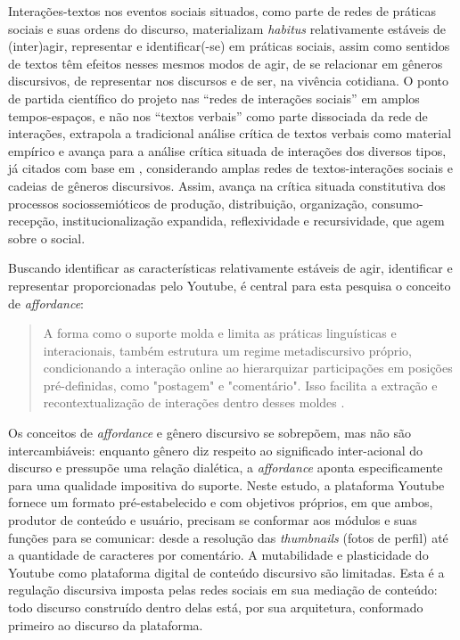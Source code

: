 \documentclass[portuguese]{textolivre}
\begin{document}
Interações-textos nos eventos sociais situados, como parte de redes de práticas sociais e suas ordens do discurso, materializam \textit{habitus} relativamente estáveis de (inter)agir, representar e identificar(-se) em práticas sociais, assim como sentidos de textos têm efeitos nesses mesmos modos de agir, de se relacionar em gêneros discursivos, de representar nos discursos e de ser, na vivência cotidiana. O ponto de partida científico do projeto nas “redes de interações sociais” em amplos tempos-espaços, e não nos “textos verbais” como parte dissociada da rede de interações, extrapola a tradicional análise crítica de textos verbais como material empírico \cite{SilvaRamalho2008GenerosDiscursivos,SilvaVieira2019Multimodalidade} e avança para a análise crítica situada de interações dos diversos tipos, já citados com base em \textcite{Thompson2018InteracaoMediada}, considerando amplas redes de textos-interações sociais e cadeias de gêneros discursivos. Assim, avança na crítica situada constitutiva dos processos sociossemióticos de produção, distribuição, organização, consumo-recepção, institucionalização expandida, reflexividade e recursividade, que agem sobre o social. 

Buscando identificar as características relativamente estáveis de agir, identificar e representar proporcionadas pelo Youtube, é central para esta pesquisa o conceito de \textit{affordance}:

\begin{quote}
    A forma como o suporte molda e limita as práticas linguísticas e interacionais, também estrutura um regime metadiscursivo próprio, condicionando a interação online ao hierarquizar participações em posições pré-definidas, como "postagem" e "comentário". Isso facilita a extração e recontextualização de interações dentro desses moldes \cite[p. 2]{ColetivaCiborga2022EtnografiaDigital}.
\end{quote}

Os conceitos de \textit{affordance} e gênero discursivo se sobrepõem, mas não são intercambiáveis: enquanto gênero diz respeito ao significado inter-acional do discurso e pressupõe uma relação dialética, a \textit{affordance} aponta especificamente para uma qualidade impositiva do suporte. Neste estudo, a plataforma Youtube fornece um formato pré-estabelecido e com objetivos próprios, em que ambos, produtor de conteúdo e usuário, precisam se conformar aos módulos e suas funções para se comunicar: desde a resolução das \textit{thumbnails} (fotos de perfil) até a quantidade de caracteres por comentário. A mutabilidade e plasticidade do Youtube como plataforma digital de conteúdo discursivo são limitadas. Esta é a regulação discursiva imposta pelas redes sociais em sua mediação de conteúdo: todo discurso construído dentro delas está, por sua arquitetura, conformado primeiro ao discurso da plataforma.
\end{document}
